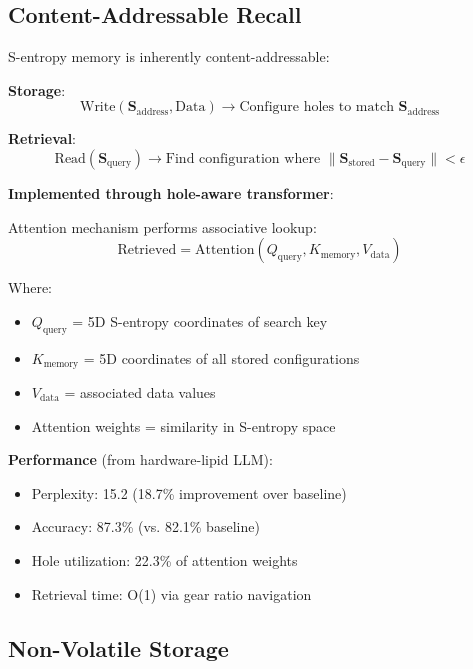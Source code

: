 \documentclass[11pt,a4paper]{article}
\begin{document}
\subsection{Content-Addressable Recall}

S-entropy memory is inherently content-addressable:

\textbf{Storage}:
\begin{equation}
\text{Write}(\mathbf{S}_{\text{address}}, \text{Data}) \rightarrow \text{Configure holes to match } \mathbf{S}_{\text{address}}
\end{equation}

\textbf{Retrieval}:
\begin{equation}
\text{Read}(\mathbf{S}_{\text{query}}) \rightarrow \text{Find configuration where } \|\mathbf{S}_{\text{stored}} - \mathbf{S}_{\text{query}}\| < \epsilon
\end{equation}

\textbf{Implemented through hole-aware transformer}:

Attention mechanism performs associative lookup:
\begin{equation}
\text{Retrieved} = \text{Attention}(Q_{\text{query}}, K_{\text{memory}}, V_{\text{data}})
\end{equation}

Where:
\begin{itemize}
\item $Q_{\text{query}}$ = 5D S-entropy coordinates of search key
\item $K_{\text{memory}}$ = 5D coordinates of all stored configurations
\item $V_{\text{data}}$ = associated data values
\item Attention weights = similarity in S-entropy space
\end{itemize}

\textbf{Performance} (from hardware-lipid LLM):
\begin{itemize}
\item Perplexity: 15.2 (18.7\% improvement over baseline)
\item Accuracy: 87.3\% (vs. 82.1\% baseline)
\item Hole utilization: 22.3\% of attention weights
\item Retrieval time: O(1) via gear ratio navigation
\end{itemize}

\subsection{Non-Volatile Storage}
\end{document}
